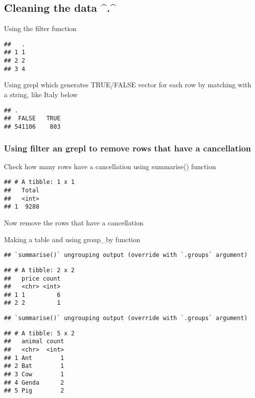 \documentclass[
]{article}
\begin{document}
\hypertarget{cleaning-the-data-.}{%
\subsection{Cleaning the data \^{}.\^{}}\label{cleaning-the-data-.}}

Using the filter function

\begin{verbatim}
##   .
## 1 1
## 2 2
## 3 4
\end{verbatim}

Using grepl which generates TRUE/FALSE vector for each row by matching
with a string, like Italy below

\begin{verbatim}
## .
##  FALSE   TRUE 
## 541106    803
\end{verbatim}

\hypertarget{using-filter-an-grepl-to-remove-rows-that-have-a-cancellation}{%
\subsubsection{Using filter an grepl to remove rows that have a
cancellation}\label{using-filter-an-grepl-to-remove-rows-that-have-a-cancellation}}

Check how many rows have a cancellation using summarise() function

\begin{verbatim}
## # A tibble: 1 x 1
##   Total
##   <int>
## 1  9288
\end{verbatim}

Now remove the rows that have a cancellation

Making a table and using group\_by function

\begin{verbatim}
## `summarise()` ungrouping output (override with `.groups` argument)
\end{verbatim}

\begin{verbatim}
## # A tibble: 2 x 2
##   price count
##   <chr> <int>
## 1 1         6
## 2 2         1
\end{verbatim}

\begin{verbatim}
## `summarise()` ungrouping output (override with `.groups` argument)
\end{verbatim}

\begin{verbatim}
## # A tibble: 5 x 2
##   animal count
##   <chr>  <int>
## 1 Ant        1
## 2 Bat        1
## 3 Cow        1
## 4 Genda      2
## 5 Pig        2
\end{verbatim}
\end{document}
